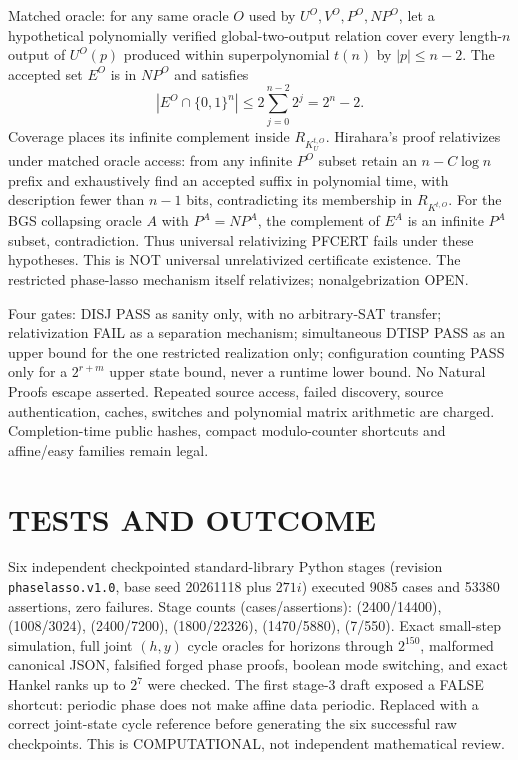 \documentclass[11pt]{article}
\begin{document}
Matched oracle: for any same oracle $O$ used by $U^O,V^O,P^O,NP^O$, let a hypothetical polynomially verified global-two-output relation cover every length-$n$ output of $U^O(p)$ produced within superpolynomial $t(n)$ by $|p|\le n-2$. The accepted set $E^O$ is in $NP^O$ and satisfies
\[
 |E^O\cap\{0,1\}^n|\le2\sum_{j=0}^{n-2}2^j=2^n-2.
\]
Coverage places its infinite complement inside $R_{K_U^{t,O}}$. Hirahara's proof relativizes under matched oracle access: from any infinite $P^O$ subset retain an $n-C\log n$ prefix and exhaustively find an accepted suffix in polynomial time, with description fewer than $n-1$ bits, contradicting its membership in $R_{K^{t,O}}$. For the BGS collapsing oracle $A$ with $P^A=NP^A$, the complement of $E^A$ is an infinite $P^A$ subset, contradiction. Thus universal relativizing PFCERT fails under these hypotheses. This is NOT universal unrelativized certificate existence. The restricted phase-lasso mechanism itself relativizes; nonalgebrization OPEN.

Four gates: DISJ PASS as sanity only, with no arbitrary-SAT transfer; relativization FAIL as a separation mechanism; simultaneous DTISP PASS as an upper bound for the one restricted realization only; configuration counting PASS only for a $2^{r+m}$ upper state bound, never a runtime lower bound. No Natural Proofs escape asserted. Repeated source access, failed discovery, source authentication, caches, switches and polynomial matrix arithmetic are charged. Completion-time public hashes, compact modulo-counter shortcuts and affine/easy families remain legal.

\section{TESTS AND OUTCOME}
Six independent checkpointed standard-library Python stages (revision \texttt{phaselasso.v1.0}, base seed 20261118 plus $271i$) executed 9085 cases and 53380 assertions, zero failures. Stage counts (cases/assertions): (2400/14400), (1008/3024), (2400/7200), (1800/22326), (1470/5880), (7/550). Exact small-step simulation, full joint $(h,y)$ cycle oracles for horizons through $2^{150}$, malformed canonical JSON, falsified forged phase proofs, boolean mode switching, and exact Hankel ranks up to $2^7$ were checked. The first stage-3 draft exposed a FALSE shortcut: periodic phase does not make affine data periodic. Replaced with a correct joint-state cycle reference before generating the six successful raw checkpoints. This is COMPUTATIONAL, not independent mathematical review.
\end{document}

